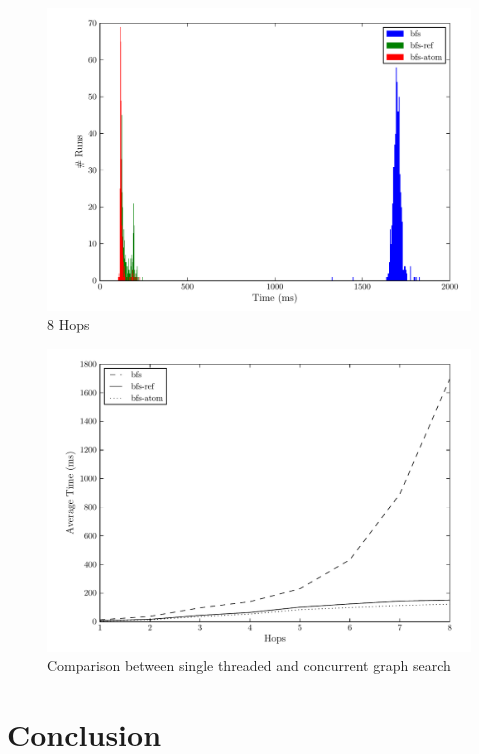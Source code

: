\documentclass[12pt,letterpaper,oneside,notitlepage]{report}
\theoremstyle{definition}
\begin{document}
    \begin{figure}[!ht]
      \centering
      \includegraphics[scale=0.85]{8_hops}
      \caption{8 Hops}
      \label{fig:perf-8-hops}
    \end{figure}
    
    \begin{figure}[!ht]
      \centering
      \includegraphics[scale=0.85]{growth}
      \caption{Comparison between single threaded and concurrent graph search}
      \label{fig:perf-growth}
    \end{figure}
  
  \chapter{Conclusion}
    \cite{rob-java-bench-08}
  
  \appendix
  
  \singlespacing
  
  
  
  \printbibliography
  
  \todos
\end{document}
